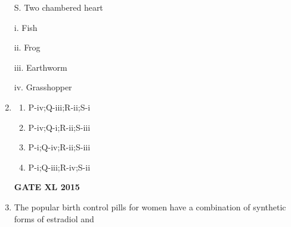 \documentclass[journal,12pt,onecolumn]{IEEEtran}
\begin{document}
\begin{enumerate}
\begin{minipage}{0.5\textwidth}
\begin{flushleft}
S. Two chambered heart
	\end{flushleft}
	\end{minipage}
	\begin{minipage}{0.5\textwidth}\begin{flushleft}
		i. Fish

		ii. Frog

		iii. Earthworm

		iv. Grasshopper

	\end{flushleft}
	\end{minipage}
\item 
    \begin{enumerate}
            \item P-iv;Q-iii;R-ii;S-i
            \item P-iv;Q-i;R-ii;S-iii
            \item P-i;Q-iv;R-ii;S-iii
            \item P-i;Q-iii;R-iv;S-ii
    \end{enumerate}
\hfill{\textbf{GATE XL 2015}}
\item  The popular birth control pills for women have a combination of synthetic forms of estradiol and


\end{enumerate}
\end{document}
